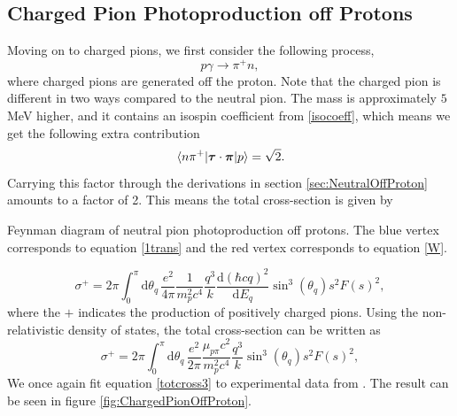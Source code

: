\subsection{Charged Pion Photoproduction off Protons}\label{sec:CoffP}
Moving on to charged pions, we first consider the following process,
\begin{equation} \label{charged1}
	p\gamma \rightarrow \pi^+ n,
\end{equation}
where charged pions are generated off the proton. Note that the charged pion is different in two ways compared to the neutral pion. The mass is approximately $5$ MeV higher, and it contains an isospin coefficient from \eqref{isocoeff}, which means we get the following extra contribution
\begin{equation} \label{isofactorcharged}
	\mel*{n\pi^+}{\bm{\mathrm{\tau}}\cdot\bm{\mathrm{\pi}}}{p} = \sqrt{2}.
\end{equation}
Carrying this factor through the derivations in section \ref{sec:NeutralOffProton} amounts to a factor of 2. This means the total cross-section is given by
\begin{marginfigure}
	\centering
	
	\caption{Feynman diagram of neutral pion photoproduction off protons. The blue vertex corresponds to equation \eqref{1trans} and the red vertex corresponds to equation \eqref{W}.}
	\label{Feynman3}
\end{marginfigure} 
\begin{equation} \label{totcross3}
	\sigma^+ =  2\pi \int_0^\pi \text{d}\theta_q \, \frac{e^2}{4\pi}\frac{1}{m_p^2c^4}\frac{q^3}{k}\frac{\text{d}(\hbar c q)^2}{\text{d}E_q}\sin^3(\theta_q) s^2 F(s)^2,
\end{equation}
where the $+$ indicates the production of positively charged pions. Using the non-relativistic density of states, the total cross-section can be written as
\begin{equation} \label{totcross3nonrel}
	\sigma^+ =  2\pi \int_0^\pi \text{d}\theta_q \, \frac{e^2}{2\pi}\frac{\mu_{p\pi}c^2}{m_p^2c^4}\frac{q^3}{k}\sin^3(\theta_q) s^2 F(s)^2,
\end{equation}
We once again fit equation \eqref{totcross3} to experimental data from \cite{PionOffNeutron}. The result can be seen in figure \ref{fig:ChargedPionOffProton}.
